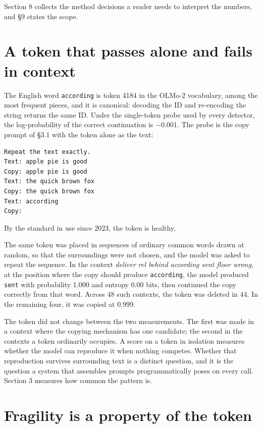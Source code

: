\documentclass[11pt]{article}
\begin{document}
Section 8 collects the method decisions a reader needs to interpret the numbers, and §9 states the scope.

\section{A token that passes alone and fails in context}\label{a-token-that-passes-alone-and-fails-in-context}

The English word \texttt{according} is token 4184 in the OLMo-2 vocabulary, among the most frequent pieces, and it is canonical: decoding the ID and re-encoding the string returns the same ID. Under the single-token probe used by every detector, the log-probability of the correct continuation is \ensuremath{-}0.001. The probe is the copy prompt of §3.1 with the token alone as the text:

\begin{Verbatim}[breaklines=true,breakanywhere=true,fontsize=\small]
Repeat the text exactly.
Text: apple pie is good
Copy: apple pie is good
Text: the quick brown fox
Copy: the quick brown fox
Text: according
Copy:
\end{Verbatim}

By the standard in use since 2023, the token is healthy.

The same token was placed in sequences of ordinary common words drawn at random, so that the surroundings were not chosen, and the model was asked to repeat the sequence. In the context \emph{deliver rel behind according sent floor wrong}, at the position where the copy should produce \texttt{according}, the model produced \texttt{sent} with probability 1.000 and entropy 0.00 bits, then continued the copy correctly from that word. Across 48 such contexts, the token was deleted in 44. In the remaining four, it was copied at 0.999.

The token did not change between the two measurements. The first was made in a context where the copying mechanism has one candidate; the second in the contexts a token ordinarily occupies. A score on a token in isolation measures whether the model can reproduce it when nothing competes. Whether that reproduction survives surrounding text is a distinct question, and it is the question a system that assembles prompts programmatically poses on every call. Section 3 measures how common the pattern is.

\section{Fragility is a property of the token}\label{fragility-is-a-property-of-the-token}
\end{document}
